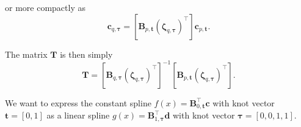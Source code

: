 or more compactly as
\begin{equation}
    [\mathbf B_{q,\boldsymbol \tau}(\boldsymbol \zeta_{q,\boldsymbol \tau})^\top] \mathbf c_{q, \boldsymbol \tau} = [\mathbf B_{p,\mathbf t}(\boldsymbol \zeta_{q,\boldsymbol \tau})^\top] \mathbf c_{p, \mathbf t}.
\end{equation}

The matrix $\mathbf T$ is then simply
\begin{equation}
    \mathbf T = [\mathbf B_{q,\boldsymbol \tau}(\boldsymbol \zeta_{q,\boldsymbol \tau})^\top]^{-1} [\mathbf B_{p,\mathbf t}(\boldsymbol \zeta_{q,\boldsymbol \tau})^{\top}].
\end{equation}

\begin{example}
    We want to express the constant spline $f(x) =\mathbf B_{0, \mathbf t}^\top\mathbf c$ with knot vector $\mathbf t = \left[0, 1\right]$ as a linear spline $g(x) = \mathbf B_{1, \boldsymbol \tau}^\top \mathbf d$ with knot vector $\boldsymbol \tau = \left[0, 0, 1, 1\right]$. 


\end{example}
